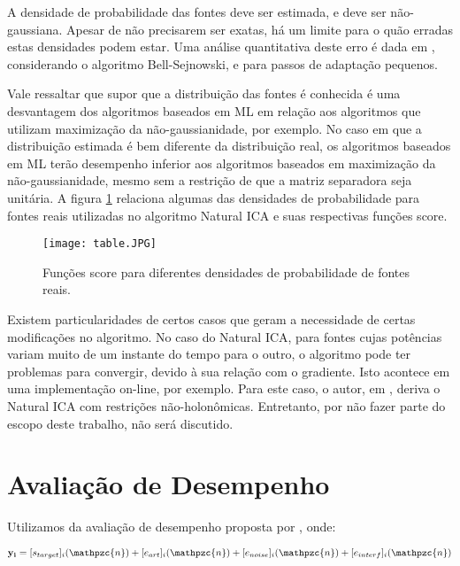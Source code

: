     A densidade de probabilidade das fontes deve ser estimada, e deve ser não-gaussiana. Apesar de não precisarem ser exatas, há um limite para o quão erradas estas densidades podem estar. Uma análise quantitativa deste erro é dada em \cite{ICA3}, considerando o algoritmo Bell-Sejnowski, e para passos de adaptação pequenos.
    
    Vale ressaltar que supor que a distribuição das fontes é conhecida é uma desvantagem dos
    algoritmos baseados em ML em relação aos algoritmos que utilizam maximização da não-gaussianidade, por exemplo. No caso em que a distribuição estimada é bem diferente da distribuição real, os algoritmos baseados em ML terão desempenho inferior aos algoritmos baseados em maximização da não-gaussianidade, mesmo sem a restrição de que a matriz separadora seja unitária. A figura \ref{fig:score} relaciona algumas das densidades de probabilidade para fontes reais utilizadas no algoritmo Natural ICA e suas respectivas funções score.
    
    \begin{figure}\label{fig:score}
        \centering
        \texttt{[image: table.JPG]}
        \caption{Funções score para diferentes densidades de probabilidade de fontes reais.}
    \end{figure}
    
    Existem particularidades de certos casos que geram a necessidade de certas modificações no algoritmo. No caso do Natural ICA, para fontes cujas potências variam muito de um instante do tempo para o outro, o algoritmo pode ter problemas para convergir, devido à sua relação com o gradiente. Isto acontece em uma implementação on-line, por exemplo. Para este caso, o autor, em \cite{holonomic}, deriva o Natural ICA com restrições não-holonômicas. Entretanto, por não fazer parte do escopo deste trabalho, não será discutido.


\section{Avaliação de Desempenho}
    Utilizamos da avaliação de desempenho proposta por \cite{performance}, onde:
    
    \begin{equation}
         \mathbf{y_i} = [s_{target}]_i(\mathpzc{n})  + [e_{art}]_i(\mathpzc{n})  +  [e_{noise}]_i(\mathpzc{n}) +  [e_{interf}]_i(\mathpzc{n})
    \end{equation}
    
